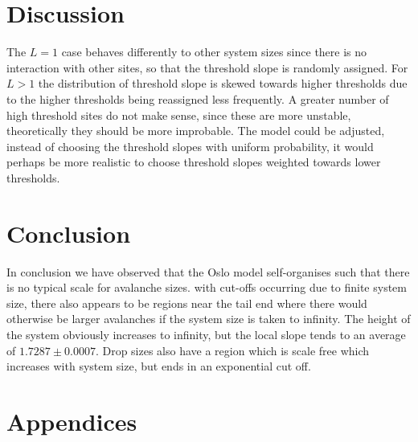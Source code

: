 \documentclass[twoside]{article}
\begin{document}

\section{Discussion}

The $L=1$ case behaves differently to other system sizes since there is no interaction with other sites, so that the threshold slope is randomly assigned. For $L>1$ the distribution of threshold slope is skewed towards higher thresholds due to the higher thresholds being reassigned less frequently. A greater number of high threshold sites do not make sense, since these are more unstable, theoretically they should be more improbable. The model could be adjusted, instead of choosing the threshold slopes with uniform probability, it would perhaps be more realistic to choose threshold slopes weighted towards lower thresholds.




\section{Conclusion}
In conclusion we have observed that the Oslo model self-organises such that there is no typical scale for avalanche sizes. with cut-offs occurring due to finite system size, there also appears to be  regions near the tail end where there would otherwise be larger avalanches if the system size is taken to infinity. The height of the system obviously increases to infinity, but the local slope tends to an average of $1.7287\pm 0.0007$. Drop sizes also have a region which is scale free which increases with system size, but ends in an exponential cut off.


\clearpage 

\section{Appendices}
\end{document}
